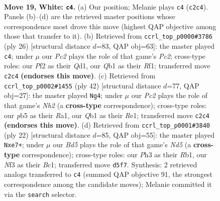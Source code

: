 \documentclass[11pt]{article}
\begin{document}
\clearpage

\begin{figure}[p]\centering
\begin{subfigure}{0.46\textwidth}\centering
\resizebox{\linewidth}{!}{%
\newchessgame
\chessboard[
  setfen={1r1q1b2/nbp1rppk/p2p4/1p1Bp2p/1P2P3/P2P1N1P/2PBRPP1/RQ3K2 w - - 1 19},
  showmover=false,
  pgfstyle=straightmove, color=movearrow, markmove={c2-c4}
]}
\caption{}
\end{subfigure}\hfill
\begin{subfigure}{0.46\textwidth}\centering
\resizebox{\linewidth}{!}{%
\newchessgame
\chessboard[
  setfen={1rbq1r2/pp2npbk/3p2pp/2pBp3/1P2P3/P2P1N2/2PB1PPP/1R1Q1RK1 w - - 1 14},
  showmover=false,
  pgfstyle=straightmove, color=movearrow, markmove={c2-c4}
]}
\caption{}
\end{subfigure}
\\[4pt]
\begin{subfigure}{0.46\textwidth}\centering
\resizebox{\linewidth}{!}{%
\newchessgame
\chessboard[
  setfen={r2r2k1/2q1bppn/2bp3p/pBp1p3/PpP1P3/3P3P/1P1BQPPN/R3R1K1 w - - 1 22},
  showmover=false,
  pgfstyle=straightmove, color=movearrow, markmove={h2-g4}
]}
\caption{}
\end{subfigure}\hfill
\begin{subfigure}{0.46\textwidth}\centering
\resizebox{\linewidth}{!}{%
\newchessgame
\chessboard[
  setfen={r1bq1rk1/1pp1npb1/3p2pp/p2N4/2Pp4/P2P2P1/1P2PPBP/1RBQ1RK1 w - - 2 12},
  showmover=false,
  pgfstyle=straightmove, color=movearrow, markmove={d5-e7}
]}
\caption{}
\end{subfigure}
\caption{\textbf{Move 19, White: \texttt{c4}.} (a) Our position; Melanie plays \texttt{c4} (\texttt{c2c4}). Panels (b)--(d) are the retrieved master positions whose correspondence most drove this move (highest QAP objective among those that transfer to it). (b) Retrieved from \texttt{ccrl\_top\_p0000\#3786} (ply 26) [structural distance $d$=83, QAP obj=63]: the master played \texttt{c4}; under $\mu$ our \emph{Pc2} plays the role of that game's \emph{Pc2}; cross-type roles: our \emph{P}f2 as their \emph{Q}d1, our \emph{Q}b1 as their \emph{R}f1; transferred move \texttt{c2c4} \textbf{(endorses this move)}. (c) Retrieved from \texttt{ccrl\_top\_p0002\#1455} (ply 42) [structural distance $d$=77, QAP obj=27]: the master played \texttt{Ng4}; under $\mu$ our \emph{Pc2} plays the role of that game's \emph{Nh2} (a \textbf{cross-type} correspondence); cross-type roles: our \emph{p}b5 as their \emph{R}a1, our \emph{Q}b1 as their \emph{R}e1; transferred move \texttt{c2c4} \textbf{(endorses this move)}. (d) Retrieved from \texttt{ccrl\_top\_p0001\#3840} (ply 22) [structural distance $d$=85, QAP obj=55]: the master played \texttt{Nxe7+}; under $\mu$ our \emph{Bd5} plays the role of that game's \emph{Nd5} (a \textbf{cross-type} correspondence); cross-type roles: our \emph{P}h3 as their \emph{R}b1, our \emph{N}f3 as their \emph{B}c1; transferred move \texttt{d5f7}. Synthesis: 2 retrieved analogs transferred to \texttt{c4} (summed QAP objective 91, the strongest correspondence among the candidate moves); Melanie committed it via the \texttt{search} selector.}
\label{fig:thought-m36}
\end{figure}
\end{document}
